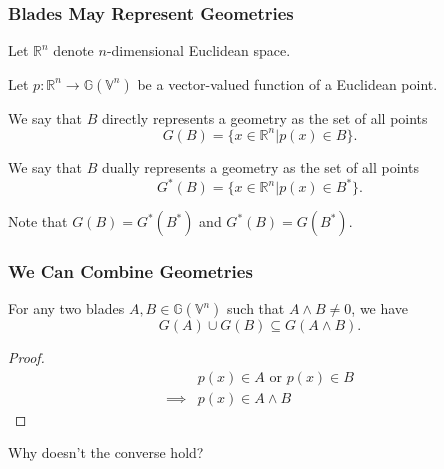\documentclass{beamer}
\newcommand{\G}{\mathbb{G}}
\newcommand{\V}{\mathbb{V}}
\newcommand{\R}{\mathbb{R}}
\begin{document}
\begin{frame}
\frametitle{Blades May Represent Geometries}
\pause
Let $\R^n$ denote $n$-dimensional Euclidean space.\pause

Let $p:\R^n\to\G(\V^n)$ be a vector-valued function of a Euclidean point.\pause
\begin{definition}
We say that $B$ \alert{directly} represents a geometry as the
set of all points
\begin{equation*}
G(B) = \{x\in\R^n|p(x)\in B\}.
\end{equation*}
\end{definition}\pause
\begin{definition}
We say that $B$ \alert{dually} represents a geometry as the
set of all points
\begin{equation*}
G^*(B) = \{x\in\R^n|p(x)\in B^*\}.
\end{equation*}
\end{definition}\pause
Note that $G(B)=G^*(B^*)$ and $G^*(B)=G(B^*)$.
\end{frame}

\begin{frame}
\frametitle{We Can Combine Geometries}
\pause
For any two blades $A,B\in\G(\V^n)$ such that $A\wedge B\neq 0$, we have
\begin{equation*}
G(A)\cup G(B)\subseteq G(A\wedge B).
\end{equation*}\pause
\begin{proof}
\begin{align*}
 & \mbox{$p(x)\in A$ or $p(x)\in B$} \\
\implies & \mbox{$p(x)\in A\wedge B$}
\end{align*}
\end{proof}\pause
Why doesn't the converse hold?
\end{frame}
\end{document}
